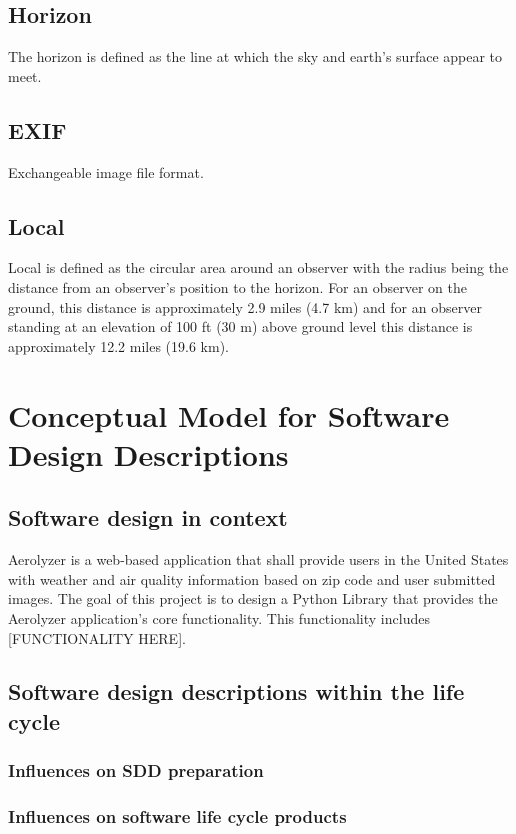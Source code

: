 \documentclass[onecolumn, draftclsnofoot,10pt, compsoc]{IEEEtran}
\begin{document}
\begin{singlespace}
	\subsection{Horizon}\label{def:horizon}
		The horizon is defined as the line at which the sky and earth's surface appear to meet.
	
	\subsection{EXIF}\label{def:exif}
		Exchangeable image file format.
	
	\subsection{Local}\label{def:local}
		Local is defined as the circular area around an observer with the radius being the distance from an observer's position to the horizon.
		For an observer on the ground, this distance is approximately 2.9 miles (4.7 km) and for an observer standing at an elevation of 100 ft (30 m) above ground level this distance is approximately 12.2 miles (19.6 km).


\section{Conceptual Model for Software Design Descriptions}
	
	\subsection{Software design in context}
		Aerolyzer is a web-based application that shall provide users in the United States with weather and air quality information based on zip code and user submitted images.
		The goal of this project is to design a Python Library that provides the Aerolyzer application's core functionality.
		This functionality includes [FUNCTIONALITY HERE].
	
	\subsection{Software design descriptions within the life cycle}
		\subsubsection{Influences on SDD preparation}
		\subsubsection{Influences on software life cycle products}

\end{singlespace}
\end{document}
